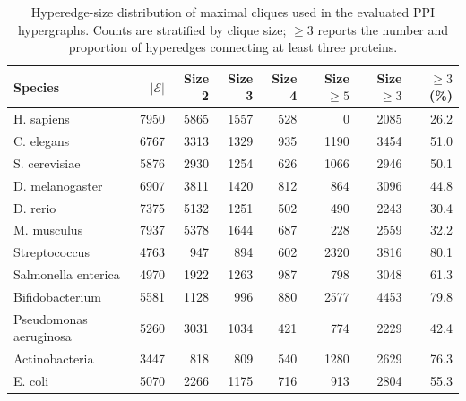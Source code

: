 \begin{table}[!htbp]
\centering
\small
\caption{Hyperedge-size distribution of maximal cliques used in the evaluated PPI hypergraphs. Counts are stratified by clique size; $\geq3$ reports the number and proportion of hyperedges connecting at least three proteins.}
\label{tab:hyperedge_size_distribution}
\begin{tabular}{lrrrrrrr}
\toprule
Species & $|\mathcal{E}|$ & Size 2 & Size 3 & Size 4 & Size $\geq5$ & Size $\geq3$ & $\geq3$ (\%) \\
\midrule
H. sapiens & 7950 & 5865 & 1557 & 528 & 0 & 2085 & 26.2 \\
C. elegans & 6767 & 3313 & 1329 & 935 & 1190 & 3454 & 51.0 \\
S. cerevisiae & 5876 & 2930 & 1254 & 626 & 1066 & 2946 & 50.1 \\
D. melanogaster & 6907 & 3811 & 1420 & 812 & 864 & 3096 & 44.8 \\
D. rerio & 7375 & 5132 & 1251 & 502 & 490 & 2243 & 30.4 \\
M. musculus & 7937 & 5378 & 1644 & 687 & 228 & 2559 & 32.2 \\
Streptococcus & 4763 & 947 & 894 & 602 & 2320 & 3816 & 80.1 \\
Salmonella enterica & 4970 & 1922 & 1263 & 987 & 798 & 3048 & 61.3 \\
Bifidobacterium & 5581 & 1128 & 996 & 880 & 2577 & 4453 & 79.8 \\
Pseudomonas aeruginosa & 5260 & 3031 & 1034 & 421 & 774 & 2229 & 42.4 \\
Actinobacteria & 3447 & 818 & 809 & 540 & 1280 & 2629 & 76.3 \\
E. coli & 5070 & 2266 & 1175 & 716 & 913 & 2804 & 55.3 \\
\bottomrule
\end{tabular}
\end{table}
